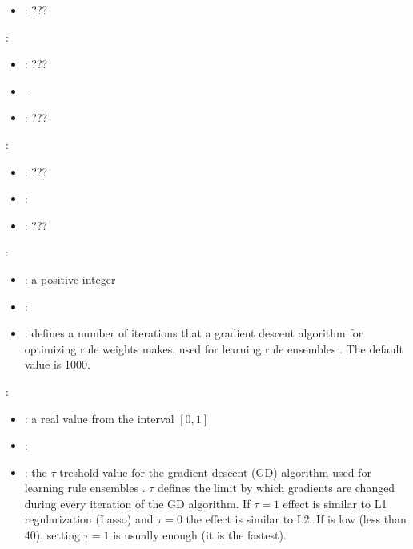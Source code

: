 \begin{itemize}
{\begin{itemize}
                \item \optionDescrption{}: ???
           \end{itemize}
    \item {}:
           \begin{itemize}
                \item \optionPossibleValues{}: ???
                \item \optionDefaultValue{}: 
                \item \optionDescrption{}: ???
           \end{itemize}
    \item {}:
           \begin{itemize}
                \item \optionPossibleValues{}: ???
                \item \optionDefaultValue{}: 
                \item \optionDescrption{}: ???
           \end{itemize}
    }
    \item {}:
           \begin{itemize}
                \item \optionPossibleValues{}: a positive integer
                \item \optionDefaultValue{}: 
                \item \optionDescrption{}: defines a number of iterations that a gradient descent algorithm for
                optimizing rule weights makes, used for learning rule ensembles \cite{Aho2009}. The default value is 1000.
           \end{itemize}
    \item {}:
           \begin{itemize}
                \item \optionPossibleValues{}: a real value from the interval $[0, 1]$
                \item \optionDefaultValue{}: 
                \item \optionDescrption{}:  the $\tau$ treshold value for the gradient descent (GD) algorithm used for learning rule ensembles \cite{Aho2009}.
                $\tau$ defines the limit by which gradients are changed during every iteration of the GD algorithm. If $\tau=1$ effect is similar to L1 regularization (Lasso) and $\tau=0$ the effect is similar to L2. If  is low (less than 40), setting $\tau=1$ is usually enough (it is the fastest).

\end{itemize}
\end{itemize}
